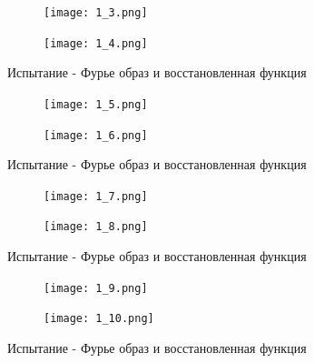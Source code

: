 \begin{figure}[!ht]
	\centering
\hspace*{\fill}%
	\begin{subfigure}[b]{0.49\textwidth}
        \centering
		\texttt{[image: 1\_3.png]}
	\end{subfigure}
\hfill
	\begin{subfigure}[b]{0.49\textwidth}
        \centering
		\texttt{[image: 1\_4.png]}
	\end{subfigure}
    \caption{Испытание - Фурье образ и восстановленная функция}
\end{figure}

\newpage

\begin{figure}[!ht]
	\centering
\hspace*{\fill}%
	\begin{subfigure}[b]{0.49\textwidth}
        \centering
		\texttt{[image: 1\_5.png]}
	\end{subfigure}
\hfill
	\begin{subfigure}[b]{0.49\textwidth}
        \centering
		\texttt{[image: 1\_6.png]}
	\end{subfigure}
    \caption{Испытание - Фурье образ и восстановленная функция}
\end{figure}

\begin{figure}[!ht]
	\centering
\hspace*{\fill}%
	\begin{subfigure}[b]{0.49\textwidth}
        \centering
		\texttt{[image: 1\_7.png]}
	\end{subfigure}
\hfill
	\begin{subfigure}[b]{0.49\textwidth}
        \centering
		\texttt{[image: 1\_8.png]}
	\end{subfigure}
    \caption{Испытание - Фурье образ и восстановленная функция}
\end{figure}

\newpage
\begin{figure}[!ht]
	\centering
\hspace*{\fill}%
	\begin{subfigure}[b]{0.49\textwidth}
        \centering
		\texttt{[image: 1\_9.png]}
	\end{subfigure}
\hfill
	\begin{subfigure}[b]{0.49\textwidth}
        \centering
		\texttt{[image: 1\_10.png]}
	\end{subfigure}
    \caption{Испытание - Фурье образ и восстановленная функция}
\end{figure}

